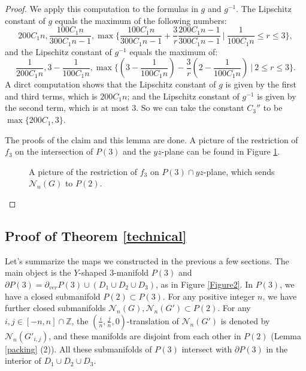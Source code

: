 \documentclass{amsart}
\begin{document}
\begin{proof}
We apply this computation to the formulas in $g$ and $g^{-1}$. The Lipschitz constant of $g$ equals
the maximum of the following numbers:
$$200C_1n, \frac{100C_1n}{300C_1n-1},\max\{\frac{100C_1n}{300C_1n-1}+\frac{3}{r}\frac{200C_1n-1}{300C_1n-1}\ |\ \frac{1}{100C_1n}\leq r \leq 3\},$$
and the Lipschitz constant of $g^{-1}$ equals the maximum of:
$$\frac{1}{200C_1n}, 3-\frac{1}{100C_1n}, \max \{(3-\frac{1}{100C_1n})-\frac{3}{r}(2-\frac{1}{100C_1n})\ |\ 2\leq r\leq 3\}.$$
A dirct computation shows that the Lipschitz constant of $g$ is given by the first and third terms, which is $200C_1n$; and the Lipschitz constant of $g^{-1}$ is given by the second term, which is at most $3$. So we can take the constant $C_3''$ to be $\max\{200C_1,3\}$.

The proofs of the claim and this lemma are done. A picture of the restriction of $f_3$ on the intersection of $P(3)$ and the $yz$-plane can be found in Figure \ref{Figure5}.


\begin{figure}[htbp]
    \centering
    \def\svgwidth{5.5in} %
    
    \caption{A picture of the restriction of $f_3$ on $P(3)\cap yz$-plane, which sends $\mathcal{N}_n(G)$ to $P(2)$.}
     \label{Figure5}
\end{figure}
\end{proof}

\subsection{Proof of Theorem \ref{technical}}



Let's summarize the maps we constructed in the previous a few sections. The main object is the $Y$-shaped $3$-manifold $P(3)$ and $\partial P(3)=\partial_{ver}P(3)\cup (D_1\cup D_2\cup D_3)$, as in Figure \ref{Figure2}. In $P(3)$, we have a closed submanifold $P(2)\subset P(3)$. For any positive integer $n$, we have further closed submanifolds $\mathcal{N}_n(G),\mathcal{N}_n(G')\subset P(2)$. For any $i,j\in [-n,n]\cap \mathbb{Z}$, the $(\frac{i}{n},\frac{j}{n},0)$-translation of $\mathcal{N}_n(G')$ is denoted by $\mathcal{N}_n(G'_{i,j})$, and these manifolds are disjoint from each other in $P(2)$ (Lemma \ref{packing} (2)). All these submanifolds of $P(3)$ intersect with $\partial P(3)$ in the interior of $D_1\cup D_2\cup D_3$.
\end{document}

